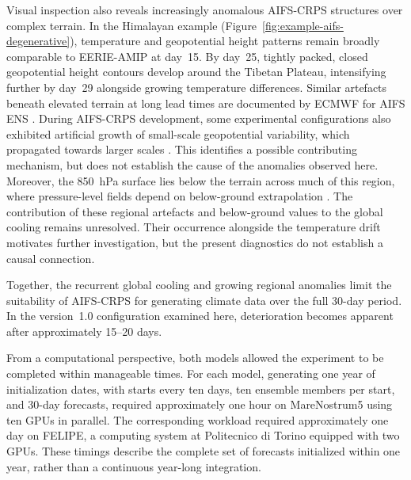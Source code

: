 Visual inspection also reveals increasingly anomalous AIFS-CRPS structures over complex terrain. In the Himalayan example (Figure~\ref{fig:example-aifs-degenerative}), temperature and geopotential height patterns remain broadly comparable to EERIE-AMIP at day~15. By day~25, tightly packed, closed geopotential height contours develop around the Tibetan Plateau, intensifying further by day~29 alongside growing temperature differences. Similar artefacts beneath elevated terrain at long lead times are documented by ECMWF for AIFS ENS \citep{ecmwf_known_2026}. During AIFS-CRPS development, some experimental configurations also exhibited artificial growth of small-scale geopotential variability, which propagated towards larger scales \citep{lang_aifs-crps_2026}. This identifies a possible contributing mechanism, but does not establish the cause of the anomalies observed here. Moreover, the 850~hPa surface lies below the terrain across much of this region, where pressure-level fields depend on below-ground extrapolation \citep{ecmwf_atmospheric_2019}. The contribution of these regional artefacts and below-ground values to the global cooling remains unresolved. Their occurrence alongside the temperature drift motivates further investigation, but the present diagnostics do not establish a causal connection.

Together, the recurrent global cooling and growing regional anomalies limit the suitability of AIFS-CRPS for generating climate data over the full 30-day period. In the version~1.0 configuration examined here, deterioration becomes apparent after approximately 15--20 days. 

From a computational perspective, both models allowed the experiment to be completed within manageable times. For each model, generating one year of initialization dates, with starts every ten days, ten ensemble members per start, and 30-day forecasts, required approximately one hour on MareNostrum5 using ten GPUs in parallel. The corresponding workload required approximately one day on FELIPE, a computing system at Politecnico di Torino equipped with two GPUs. These timings describe the complete set of forecasts initialized within one year, rather than a continuous year-long integration.

